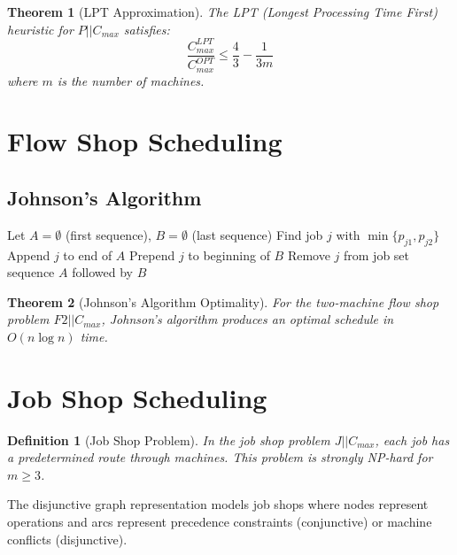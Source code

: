 \documentclass[a4paper, 11pt]{article}
\newtheorem{definition}{Definition}[section]
\newtheorem{theorem}{Theorem}[section]
\begin{document}
\begin{theorem}[LPT Approximation]
The LPT (Longest Processing Time First) heuristic for $P||C_{max}$ satisfies:
\begin{equation}
\frac{C_{max}^{LPT}}{C_{max}^{OPT}} \leq \frac{4}{3} - \frac{1}{3m}
\end{equation}
where $m$ is the number of machines.
\end{theorem}

\section{Flow Shop Scheduling}

\subsection{Johnson's Algorithm}

\begin{algorithm}
\caption{Johnson's Algorithm for $F2||C_{max}$}
\begin{algorithmic}[1]
\State Let $A = \emptyset$ (first sequence), $B = \emptyset$ (last sequence)
    \State Find job $j$ with $\min\{p_{j1}, p_{j2}\}$
        \State Append $j$ to end of $A$
    \Else
        \State Prepend $j$ to beginning of $B$
    \EndIf
    \State Remove $j$ from job set
\EndWhile
\State \Return sequence $A$ followed by $B$
\end{algorithmic}
\end{algorithm}

\begin{theorem}[Johnson's Algorithm Optimality]
For the two-machine flow shop problem $F2||C_{max}$, Johnson's algorithm produces an
optimal schedule in $O(n \log n)$ time.
\end{theorem}

\section{Job Shop Scheduling}

\begin{definition}[Job Shop Problem]
In the job shop problem $J||C_{max}$, each job has a predetermined route through machines.
This problem is strongly NP-hard for $m \geq 3$.
\end{definition}

The disjunctive graph representation models job shops where nodes represent operations and
arcs represent precedence constraints (conjunctive) or machine conflicts (disjunctive).
\end{document}
